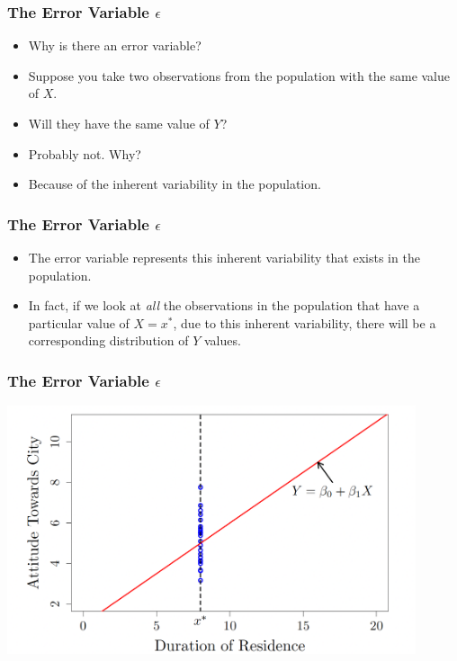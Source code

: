 \documentclass[12pt]{beamer}
\begin{document}
\begin{frame}
	\frametitle{\color{blue}The Error Variable $\epsilon$}
	
	
	\begin{itemize}[label={\color{blue}$\blacktriangleright$}]
		\item Why is there an error variable?
		
		\item Suppose you take two observations from the population with the same value of $X$.
		
		\item Will they have the same value of $Y$?
		
		\item Probably not. Why?
		
		\item Because of the inherent variability in the population.
	\end{itemize}
	
\end{frame}
\begin{frame}
	\frametitle{\color{blue}The Error Variable $\epsilon$}
	
	
	\begin{itemize}[label={\color{blue}$\blacktriangleright$}]
		\item The error variable represents this inherent variability that exists in the population.
		
		\item In fact, if we look at \textit{all} the observations in the population that have a particular value of $X = x^*$, due to this inherent variability, there will be a corresponding distribution of $Y$ values.
	\end{itemize}
	
\end{frame}
\begin{frame}
	\frametitle{\color{blue}The Error Variable $\epsilon$}
	\centering
	\includegraphics[width=12cm]{error.png}
	
\end{frame}
\end{document}
